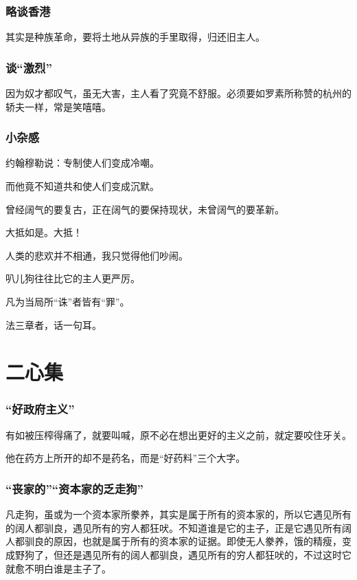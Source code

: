 \documentclass[a4paper]{article}
\begin{document}
\begin{sloppy}
        \section{
            略谈香港
        }
        其实是种族革命，要将土地从异族的手里取得，归还旧主人。

        \section{
            谈“激烈”
        }
        因为奴才都叹气，虽无大害，主人看了究竟不舒服。必须要如罗素所称赞的杭州的轿夫一样，常是笑嘻嘻。

        \section{
            小杂感
        }
        约翰穆勒说：专制使人们变成冷嘲。

        而他竟不知道共和使人们变成沉默。

        \vspace{1em}
        曾经阔气的要复古，正在阔气的要保持现状，未曾阔气的要革新。

        大抵如是。大抵！

        \vspace{1em}
        人类的悲欢并不相通，我只觉得他们吵闹。

        \vspace{1em}
        叭儿狗往往比它的主人更严厉。

        \vspace{1em}
        凡为当局所“诛”者皆有“罪”。

        \vspace{1em}
        法三章者，话一句耳。

        \part{二心集}
        \section{
            “好政府主义”
        }
        有如被压榨得痛了，就要叫喊，原不必在想出更好的主义之前，就定要咬住牙关。

        他在药方上所开的却不是药名，而是“好药料”三个大字。

        \section{
            “丧家的”“资本家的乏走狗”
        }
        凡走狗，虽或为一个资本家所豢养，其实是属于所有的资本家的，所以它遇见所有的阔人都驯良，遇见所有的穷人都狂吠。不知道谁是它的主子，正是它遇见所有阔人都驯良的原因，也就是属于所有的资本家的证据。即使无人豢养，饿的精瘦，变成野狗了，但还是遇见所有的阔人都驯良，遇见所有的穷人都狂吠的，不过这时它就愈不明白谁是主子了。


\end{sloppy}
\end{document}
